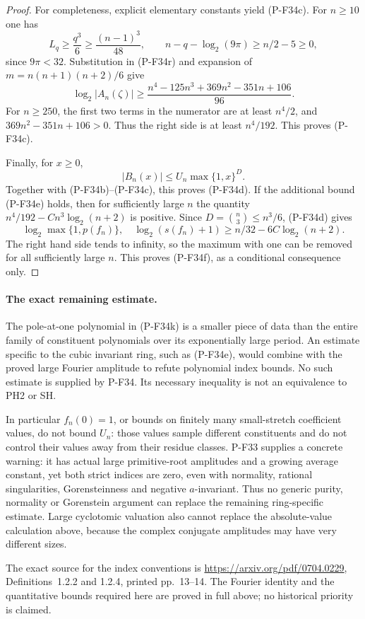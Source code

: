 \documentclass[11pt,a4paper]{article}
\begin{document}
\begin{proof}
For completeness, explicit elementary constants yield
(P-F34c). For $n\ge10$ one has
\[
 L_q\ge\frac{q^3}{6}\ge\frac{(n-1)^3}{48},\qquad
 n-q-\log_2(9\pi)\ge n/2-5\ge0,
\]
since $9\pi<32$. Substitution in (P-F34r) and expansion
of $m=n(n+1)(n+2)/6$ give
\[
 \log_2|A_n(\zeta)|
 \ge
 \frac{n^4-125n^3+369n^2-351n+106}{96}.
 \tag{P-F34s}
\]
For $n\ge250$, the first two terms in the numerator
are at least $n^4/2$, and
$369n^2-351n+106>0$. Thus the right side is at least
$n^4/192$. This proves (P-F34c).

Finally, for $x\ge0$,
\[
 |B_n(x)|\le U_n\max\{1,x\}^{D}.
\]
Together with (P-F34b)--(P-F34c), this proves
(P-F34d). If the additional bound (P-F34e) holds,
then for sufficiently large $n$ the quantity
$n^4/192-Cn^3\log_2(n+2)$ is positive. Since
$D=\binom n3\le n^3/6$, (P-F34d) gives
\[
 \log_2\max\{1,p(f_n)\},\quad\log_2(s(f_n)+1)
       \ge n/32-6C\log_2(n+2).
\]
The right hand side tends to infinity, so the maximum
with one can be removed for all sufficiently large
$n$. This proves (P-F34f), as a conditional consequence
only.
\end{proof}

\paragraph{The exact remaining estimate.}
The pole-at-one polynomial in (P-F34k) is a smaller
piece of data than the entire family of constituent
polynomials over its exponentially large period.
An estimate specific to the cubic invariant ring,
such as (P-F34e), would combine with the proved large
Fourier amplitude to refute polynomial index bounds.
No such estimate is supplied by P-F34. Its necessary
inequality is not an equivalence to PH2 or SH.

In particular $f_n(0)=1$, or bounds on finitely many
small-stretch coefficient values, do not bound $U_n$:
those values sample different constituents and do not
control their values away from their residue classes.
P-F33 supplies a concrete warning: it has actual large
primitive-root amplitudes and a growing average constant,
yet both strict indices are zero, even with normality,
rational singularities, Gorensteinness and negative
$a$-invariant. Thus no generic purity, normality or
Gorenstein argument can replace the remaining
ring-specific estimate. Large cyclotomic valuation
also cannot replace the absolute-value calculation
above, because the complex conjugate amplitudes may
have very different sizes.

The exact source for the index conventions is
\url{https://arxiv.org/pdf/0704.0229}, Definitions~1.2.2
and 1.2.4, printed pp.~13--14. The Fourier identity
and the quantitative bounds required here are proved
in full above; no historical priority is claimed.
\end{document}
